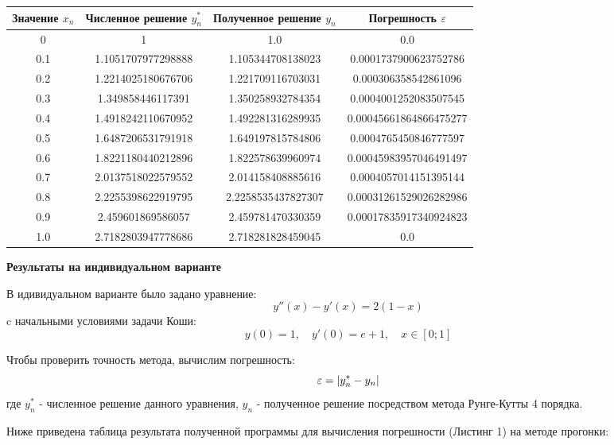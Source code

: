 \documentclass [12pt]{article}
\DeclarePairedDelimiter{\abs}{\lvert}{\rvert}
\begin{document}
\begin{center}
\begin{tabular}{ |c|c|c|c| }
  \hline
  Значение $x_{n}$ & Численное решение $y^{*}_{n}$ & Полученное решение $y_{n}$ & Погрешность $\varepsilon$ \\ \hline
  0 & 1 & 1.0 & 0.0 \\ \hline
  0.1 & 1.1051707977298888 & 1.105344708138023 & 0.0001737900623752786 \\ \hline
  0.2 & 1.2214025180676706 & 1.221709116703031 & 0.000306358542861096 \\ \hline
  0.3 & 1.349858446117391 & 1.350258932784354 & 0.0004001252083507545 \\ \hline
  0.4 & 1.4918242110670952 & 1.492281316289935 & 0.00045661864866475277 \\ \hline
  0.5 & 1.6487206531791918 & 1.649197815784806 & 0.0004765450846777597 \\ \hline
  0.6 & 1.8221180440212896 & 1.822578639960974 & 0.00045983957046491497 \\ \hline
  0.7 & 2.0137518022579552 & 2.014158408885616 & 0.0004057014151395144 \\ \hline
  0.8 & 2.2255398622919795 & 2.2258535437827307 & 0.00031261529026282986 \\ \hline
  0.9 & 2.459601869586057 & 2.459781470330359 & 0.00017835917340924823 \\ \hline
  1.0 & 2.7182803947778686 & 2.718281828459045 & 0.0 \\ \hline
\end{tabular}
\end{center}

\textbf{Результаты на индивидуальном варианте}

В идивидуальном варианте было задано уравнение: $$y''(x) - y'(x)=2(1-x)$$
c начальными условиями задачи Коши: $$ y(0)=1, \quad y'(0)=e + 1, \quad x \in [0;1] $$

Чтобы проверить точность метода, вычислим погрешность: $$\varepsilon=\abs{y^{*}_{n}-y_{n}}$$ где $y^{*}_{n}$ - численное решение данного уравнения, $y_{n}$ - полученное решение посредством метода Рунге-Кутты 4 порядка. 

Ниже приведена таблица результата полученной программы для вычисления погрешности (Листинг 1) на методе прогонки:
\end{document}
